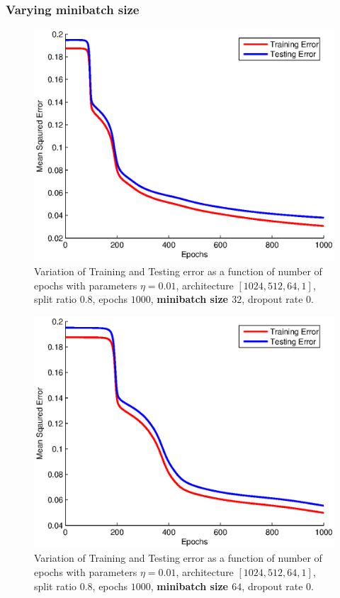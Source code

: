 \documentclass{article}
\newcommand{\myScale}{0.56}
\begin{document}
\subsubsection{Varying minibatch size}
\begin{figure}[H]
\includegraphics[scale=\myScale]{../q2/part2_32}
\caption{Variation of Training and Testing error as a function of number of epochs with parameters $\eta=0.01$, architecture $[1024,512,64,1]$, split ratio $0.8$, epochs $1000$, {\bf minibatch size $32$}, dropout rate $0$.}
\label{fig:fig17}
\end{figure}
\begin{figure}[H]
\includegraphics[scale=\myScale]{../q2/part2_64}
\caption{Variation of Training and Testing error as a function of number of epochs with parameters $\eta=0.01$, architecture $[1024,512,64,1]$, split ratio $0.8$, epochs $1000$, {\bf minibatch size $64$}, dropout rate $0$.}
\label{fig:fig18}
\end{figure}
\end{document}
